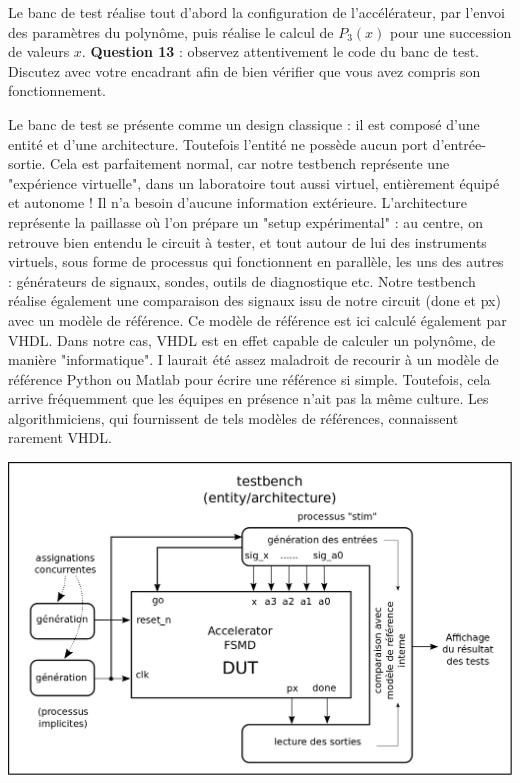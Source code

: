 \documentclass[a4paper,11pt]{exam}
\begin{document}
\begin{questions}
  Le banc de test réalise tout d'abord la configuration de l'accélérateur, par l'envoi des paramètres du polynôme, puis réalise le calcul de $P_3(x)$ pour une succession de valeurs $x$.
  \question \textbf{Question 13} : observez attentivement le code du banc de test. Discutez avec votre encadrant afin de bien vérifier que vous avez compris son fonctionnement.
  \begin{solution}
    Le banc de test se présente comme un design classique : il est composé d'une entité et d'une architecture. Toutefois l'entité ne possède aucun port d'entrée-sortie. Cela est parfaitement normal, car
    notre testbench représente une "expérience virtuelle", dans un laboratoire tout aussi virtuel, entièrement équipé et autonome ! Il n'a besoin d'aucune information extérieure. L'architecture représente
    la paillasse où l'on prépare un "setup expérimental" : au centre, on retrouve bien entendu le circuit à tester, et tout autour de lui des instruments virtuels, sous forme de processus qui fonctionnent en parallèle, les uns des autres : générateurs de signaux, sondes, outils de diagnostique etc. Notre testbench réalise également une comparaison des signaux issu de notre circuit (done et px) avec un modèle de référence. Ce modèle de référence est ici calculé également par VHDL. Dans notre cas, VHDL est en effet capable de calculer un polynôme, de manière "informatique". I laurait été assez maladroit de recourir à un modèle de référence Python ou Matlab pour écrire une référence si simple. Toutefois, cela arrive fréquemment que les équipes en présence n'ait pas la même culture. Les algorithmiciens, qui fournissent de tels modèles de références, connaissent rarement VHDL.
    \begin{center}
      \includegraphics[scale=0.3]{fsmd_tb.png}
    \end{center}
  \end{solution}


\end{questions}
\end{document}
